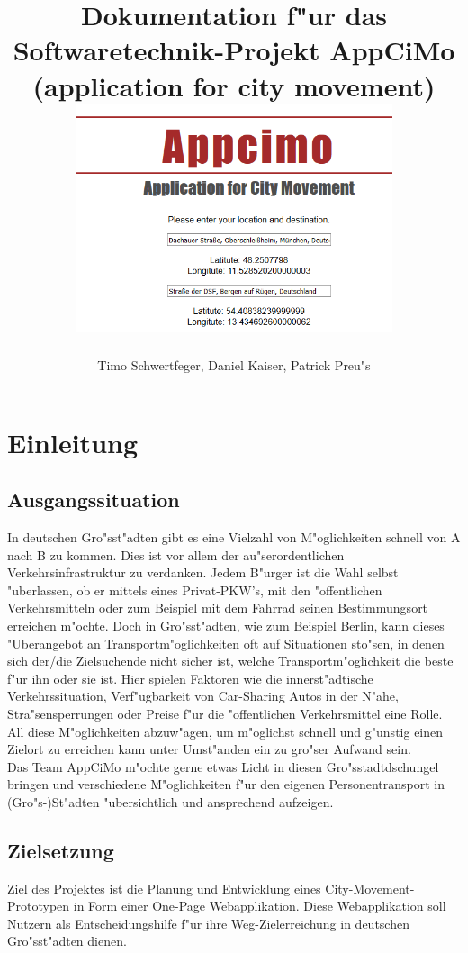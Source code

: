\documentclass[a4paper, 11pt]{scrreprt}
\author{Timo Schwertfeger, Daniel Kaiser, Patrick Preu"s}
\title{Dokumentation f"ur das Softwaretechnik-Projekt AppCiMo (application for city movement)
\newline
\newline
\includegraphics[width=0.7\textwidth]{appcimo.png}}
\begin{document}
\maketitle

\setcounter{secnumdepth}{5}
\setcounter{tocdepth}{5}

\tableofcontents


\chapter{Einleitung}





\section{Ausgangssituation}
In deutschen Gro"sst"adten gibt es eine Vielzahl von M"oglichkeiten schnell von A nach B zu kommen. Dies ist vor allem der au"serordentlichen Verkehrsinfrastruktur zu verdanken. Jedem B"urger ist die Wahl selbst "uberlassen, ob er mittels eines Privat-PKW’s, mit den "offentlichen Verkehrsmitteln oder zum Beispiel mit dem Fahrrad seinen Bestimmungsort erreichen m"ochte. Doch in Gro"sst"adten, wie zum Beispiel Berlin, kann dieses "Uberangebot an Transportm"oglichkeiten oft auf Situationen sto"sen, in denen sich der/die Zielsuchende nicht sicher ist, welche Transportm"oglichkeit die beste f"ur ihn oder sie ist. Hier spielen Faktoren wie die innerst"adtische Verkehrssituation, Verf"ugbarkeit von Car-Sharing Autos in der N"ahe, Stra"sensperrungen oder Preise f"ur die "offentlichen Verkehrsmittel eine Rolle. All diese M"oglichkeiten abzuw"agen, um m"oglichst schnell und g"unstig einen Zielort zu erreichen kann unter Umst"anden ein zu gro"ser Aufwand sein. \\

Das Team AppCiMo m"ochte gerne etwas Licht in diesen Gro"sstadtdschungel bringen und verschiedene M"oglichkeiten f"ur den eigenen Personentransport in (Gro"s-)St"adten "ubersichtlich und ansprechend aufzeigen.



\section{Zielsetzung}
Ziel des Projektes ist die Planung und Entwicklung eines City-Movement-Prototypen in Form einer One-Page Webapplikation. Diese Webapplikation soll Nutzern als Entscheidungshilfe f"ur ihre Weg-Zielerreichung in deutschen Gro"sst"adten dienen. \\
\end{document}
